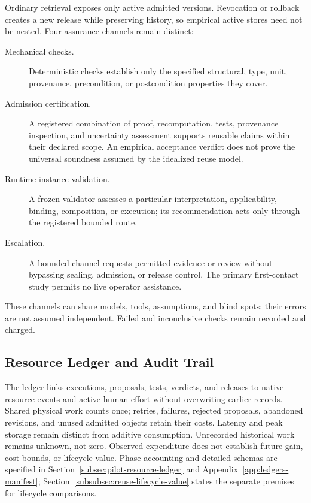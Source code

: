\documentclass[10pt]{article} %
\providecommand{\1}{\mathbf{1}}  %
\theoremstyle{remark}
\theoremstyle{definition}
\begin{document}
Ordinary retrieval exposes only active admitted versions. Revocation or
rollback creates a new release while preserving history, so empirical
active stores need not be nested. Four assurance channels remain
distinct:
\begin{description}
\item[Mechanical checks.]
Deterministic checks establish only the specified structural, type, unit,
provenance, precondition, or postcondition properties they cover.

\item[Admission certification.]
A registered combination of proof, recomputation, tests, provenance
inspection, and uncertainty assessment supports reusable claims within
their declared scope. An
empirical acceptance verdict does not prove the universal soundness
assumed by the idealized reuse model.

\item[Runtime instance validation.]
A frozen validator assesses a particular interpretation, applicability,
binding, composition, or execution; its recommendation acts only through
the registered bounded route.

\item[Escalation.]
A bounded channel requests permitted evidence or review without bypassing
sealing, admission, or release control. The primary first-contact study
permits no live operator assistance.
\end{description}
These channels can share models, tools, assumptions, and blind spots;
their errors are not assumed independent. Failed and inconclusive checks
remain recorded and charged.

\subsection{Resource Ledger and Audit Trail}
\label{subsec:courtroom-resources}

The ledger links executions, proposals, tests, verdicts, and releases to
native resource events and active human effort without overwriting
earlier records. Shared physical work counts once; retries, failures,
rejected proposals, abandoned revisions, and unused admitted objects
retain their costs. Latency and peak storage remain distinct from
additive consumption. Unrecorded historical work remains unknown, not
zero. Observed expenditure does not establish future gain, cost bounds,
or lifecycle value. Phase accounting and detailed schemas are specified
in Section~\ref{subsec:pilot-resource-ledger} and
Appendix~\ref{app:ledgers-manifest};
Section~\ref{subsubsec:reuse-lifecycle-value} states the separate
premises for lifecycle comparisons.
\end{document}
